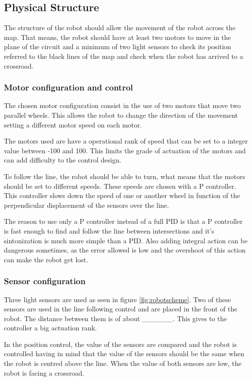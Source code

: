 \subsection{Physical Structure}
The structure of the robot should allow the movement of the robot across the map. 
That means, the robot should have at least two motors to move in the plane of the circuit and a minimum of two light sensors to check its position referred to the black lines of the map and check when the robot has arrived to a crossroad.

\subsubsection{Motor configuration and control}
The chosen motor configuration consist in the use of two motors that move two parallel wheels. 
This allows the robot to change the direction of the movement setting a different motor speed on each motor.

The motors used are have a operational rank of speed that can be set to a integer value between -100 and 100.
This limits the grade of actuation of the motors and can add difficulty to the control design. 

To follow the line, the robot should be able to turn, what means that the motors should be set to different speeds.
These speeds are chosen with a P controller.
This controller slows down the speed of one or another wheel in function of the perpendicular displacement of the sensors 
over the line. 

The reason to use only a P controller instead of a full PID is that a P controller is fast enough to find and follow 
the line between intersections and it's sintonization is much more simple than a PID.
Also adding integral action can be dangerous sometimes, as the error allowed is low and the overshoot of this action 
can make the robot get lost.


\subsubsection{Sensor configuration}

Three light sensors are used as seen in figure \ref{fig:robotscheme}. 
Two of these sensors are used in the line following control and are placed in the front of the robot.
The distance between them is of about \_\_\_\_\_\_.
This gives to the controller a big actuation rank.

In the position control, the value of the sensors are compared and the robot is controlled having in mind that the value of the sensors should be the same when the robot is centred above the line.
When the value of both sensors are low, the robot is facing a crossroad.

